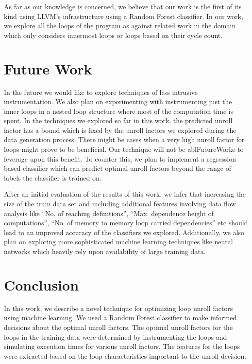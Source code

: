 \documentclass[]{sig-alternate}
\begin{document}
As far as our knowledge is concerned, we believe that our work is the first of its kind using LLVM's infrastructure using a Random Forest classifier. In our work, we  explore all the loops of the program as against related work in the domain which only considers innermost loops or loops based on their cycle count.

\section{Future Work}
\label{sec:FutureWork}
In the future we would like to explore techniques of less intrusive instrumentation. We also plan on experimenting with instrumenting just the inner loops in a nested loop structure where most of the computation time is spent. In the techniques we explored so far in this work, the predicted unroll factor has a bound which is fixed by the unroll factors we explored during the data generation process. There might be cases when a very high unroll factor for loops might prove to be beneficial. Our technique will not be ablFutureWorke to leverage upon this benefit. To counter this, we plan to implement a regression based classifier which can predict optimal unroll factors beyond the range of labels the classifier is trained on.

After an initial evaluation of the results of this work, we infer that increasing the size of the train data set and including additional features involving data flow analysis like ``No. of reaching definitions'', ``Max. dependence height of computations'',  ``No. of memory to memory loop carried dependencies'' etc should lead to an improved accuracy of the classifiers we explored. Additionally, we also plan on exploring more sophisticated machine learning techniques like neural networks which heavily rely upon availability of large training data.

\section{Conclusion}
\label{sec:Conclusion}

In this work, we describe a novel technique for optimizing loop unroll factors using machine learning. We used a Random Forest classifier to make informed decisions about the optimal unroll factors. The optimal unroll factors for the loops in the training data were determined by instrumenting the loops and simulating execution times for various unroll factors. The features for the loops were extracted based on the loop characteristics important to the unroll decision.  
\end{document}
